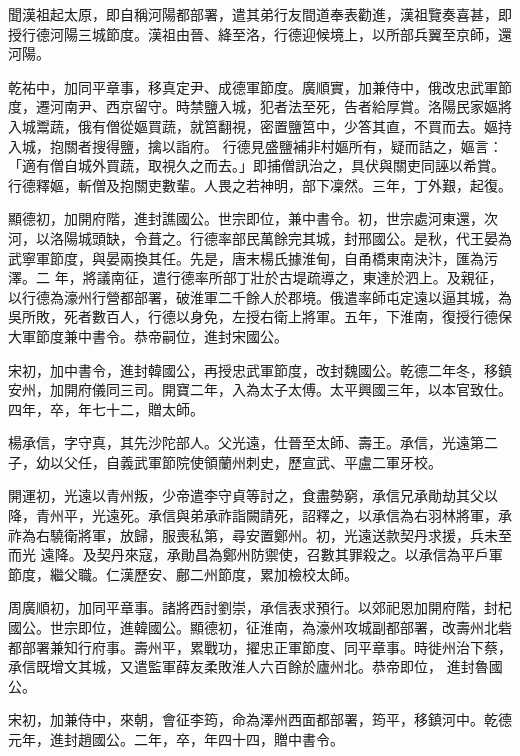\begin{pinyinscope}
 聞漢祖起太原，即自稱河陽都部署，遣其弟行友間道奉表勸進，漢祖覽奏喜甚，即授行德河陽三城節度。漢祖由晉、絳至洛，行德迎候境上，以所部兵翼至京師，還河陽。



 乾祐中，加同平章事，移真定尹、成德軍節度。廣順實，加兼侍中，俄改忠武軍節度，遷河南尹、西京留守。時禁鹽入城，犯者法至死，告者給厚賞。洛陽民家嫗將入城鬻蔬，俄有僧從嫗買蔬，就筥翻視，密置鹽筥中，少答其直，不買而去。嫗持入城，抱關者搜得鹽，擒以詣府。
 行德見盛鹽補非村嫗所有，疑而詰之，嫗言：「適有僧自城外買蔬，取視久之而去。」即捕僧訊治之，具伏與關吏同誣以希賞。行德釋嫗，斬僧及抱關吏數輩。人畏之若神明，部下凜然。三年，丁外艱，起復。



 顯德初，加開府階，進封譙國公。世宗即位，兼中書令。初，世宗處河東還，次河，以洛陽城頭缺，令葺之。行德率部民萬餘完其城，封邢國公。是秋，代王晏為武寧軍節度，與晏兩換其任。先是，唐末楊氏據淮甸，自甬橋東南決汴，匯為污澤。二
 年，將議南征，遣行德率所部丁壯於古堤疏導之，東達於泗上。及親征，以行德為濠州行營都部署，破淮軍二千餘人於郡境。俄遣率師屯定遠以逼其城，為吳所敗，死者數百人，行德以身免，左授右衛上將軍。五年，下淮南，復授行德保大軍節度兼中書令。恭帝嗣位，進封宋國公。



 宋初，加中書令，進封韓國公，再授忠武軍節度，改封魏國公。乾德二年冬，移鎮安州，加開府儀同三司。開寶二年，入為太子太傅。太平興國三年，以本官致仕。
 四年，卒，年七十二，贈太師。



 楊承信，字守真，其先沙陀部人。父光遠，仕晉至太師、壽王。承信，光遠第二子，幼以父任，自義武軍節院使領蘭州刺史，歷宣武、平盧二軍牙校。



 開運初，光遠以青州叛，少帝遣李守貞等討之，食盡勢窮，承信兄承勛劫其父以降，青州平，光遠死。承信與弟承祚詣闕請死，詔釋之，以承信為右羽林將軍，承祚為右驍衛將軍，放歸，服喪私第，尋安置鄭州。初，光遠送款契丹求援，兵未至而光
 遠降。及契丹來寇，承勛昌為鄭州防禦使，召數其罪殺之。以承信為平戶軍節度，繼父職。仁漢歷安、鄜二州節度，累加檢校太師。



 周廣順初，加同平章事。諸將西討劉崇，承信表求預行。以郊祀恩加開府階，封杞國公。世宗即位，進韓國公。顯德初，征淮南，為濠州攻城副都部署，改壽州北砦都部署兼知行府事。壽州平，累戰功，擢忠正軍節度、同平章事。時徙州治下蔡，承信既增文其城，又遣監軍薛友柔敗淮人六百餘於廬州北。恭帝即位，
 進封魯國公。



 宋初，加兼侍中，來朝，會征李筠，命為澤州西面都部署，筠平，移鎮河中。乾德元年，進封趙國公。二年，卒，年四十四，贈中書令。




\end{pinyinscope}
